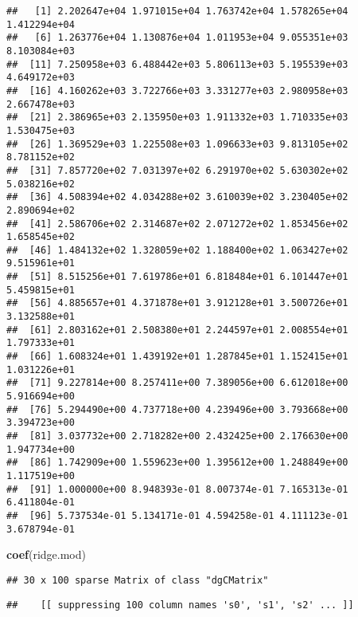 \documentclass[]{article}
\newenvironment{Shaded}{\begin{snugshade}}{\end{snugshade}}
\newcommand{\KeywordTok}[1]{\textcolor[rgb]{0.13,0.29,0.53}{\textbf{#1}}}
\newcommand{\NormalTok}[1]{#1}
\begin{document}
\begin{verbatim}
##   [1] 2.202647e+04 1.971015e+04 1.763742e+04 1.578265e+04 1.412294e+04
##   [6] 1.263776e+04 1.130876e+04 1.011953e+04 9.055351e+03 8.103084e+03
##  [11] 7.250958e+03 6.488442e+03 5.806113e+03 5.195539e+03 4.649172e+03
##  [16] 4.160262e+03 3.722766e+03 3.331277e+03 2.980958e+03 2.667478e+03
##  [21] 2.386965e+03 2.135950e+03 1.911332e+03 1.710335e+03 1.530475e+03
##  [26] 1.369529e+03 1.225508e+03 1.096633e+03 9.813105e+02 8.781152e+02
##  [31] 7.857720e+02 7.031397e+02 6.291970e+02 5.630302e+02 5.038216e+02
##  [36] 4.508394e+02 4.034288e+02 3.610039e+02 3.230405e+02 2.890694e+02
##  [41] 2.586706e+02 2.314687e+02 2.071272e+02 1.853456e+02 1.658545e+02
##  [46] 1.484132e+02 1.328059e+02 1.188400e+02 1.063427e+02 9.515961e+01
##  [51] 8.515256e+01 7.619786e+01 6.818484e+01 6.101447e+01 5.459815e+01
##  [56] 4.885657e+01 4.371878e+01 3.912128e+01 3.500726e+01 3.132588e+01
##  [61] 2.803162e+01 2.508380e+01 2.244597e+01 2.008554e+01 1.797333e+01
##  [66] 1.608324e+01 1.439192e+01 1.287845e+01 1.152415e+01 1.031226e+01
##  [71] 9.227814e+00 8.257411e+00 7.389056e+00 6.612018e+00 5.916694e+00
##  [76] 5.294490e+00 4.737718e+00 4.239496e+00 3.793668e+00 3.394723e+00
##  [81] 3.037732e+00 2.718282e+00 2.432425e+00 2.176630e+00 1.947734e+00
##  [86] 1.742909e+00 1.559623e+00 1.395612e+00 1.248849e+00 1.117519e+00
##  [91] 1.000000e+00 8.948393e-01 8.007374e-01 7.165313e-01 6.411804e-01
##  [96] 5.737534e-01 5.134171e-01 4.594258e-01 4.111123e-01 3.678794e-01
\end{verbatim}

\begin{Shaded}
\begin{Highlighting}[]
\KeywordTok{coef}\NormalTok{(ridge.mod)}
\end{Highlighting}
\end{Shaded}

\begin{verbatim}
## 30 x 100 sparse Matrix of class "dgCMatrix"
\end{verbatim}

\begin{verbatim}
##    [[ suppressing 100 column names 's0', 's1', 's2' ... ]]
\end{verbatim}
\end{document}
